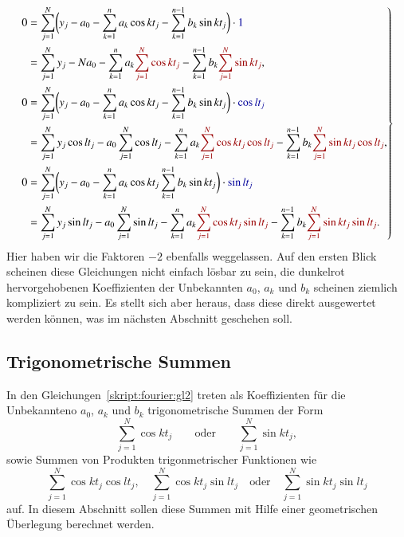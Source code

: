 \begin{equation}
\left.
\begin{aligned}
0&=
\sum_{j=1}^N
\biggl(
y_j - a_0 - \sum_{k=1}^n a_k\cos kt_j - \sum_{k=1}^{n-1} b_k\sin kt_j
\biggr)\cdot\mathstrut{\color{darkblue}1}
\\
&=
\sum_{j=1}^N y_j
-Na_0
-\sum_{k=1}^n a_k {\color{darkred}\sum_{j=1}^N\cos kt_j}
-\sum_{k=1}^{n-1} b_k {\color{darkred}\sum_{j=1}^N\sin kt_j},
\\
0&=
\sum_{j=1}^N
\biggl(
y_j - a_0 - \sum_{k=1}^n a_k\cos kt_j - \sum_{k=1}^{n-1} b_k\sin kt_j
\biggr)\cdot\mathstrut {\color{darkblue}\cos lt_j}
\\
&=
\sum_{j=1}^N y_j \cos lt_j
-a_0\sum_{j=1}^N \cos lt_j
-\sum_{k=1}^n a_k {\color{darkred}\sum_{j=1}^N\cos kt_j\cos lt_j}
-\sum_{k=1}^{n-1} b_k {\color{darkred}\sum_{j=1}^N\sin kt_j\cos lt_j},
\\
0
&=
\sum_{j=1}^N
\biggl(
y_j - a_0 - \sum_{k=1}^n a_k\cos kt_j \sum_{k=1}^{n-1} b_k\sin kt_j
\biggr)\cdot\mathstrut {\color{darkblue}\sin lt_j}
\\
&=
\sum_{j=1}^N y_j \sin lt_j
-a_0\sum_{j=1}^N \sin lt_j
-\sum_{k=1}^n a_k {\color{darkred}\sum_{j=1}^N\cos kt_j\sin lt_j}
-\sum_{k=1}^{n-1} b_k {\color{darkred}\sum_{j=1}^N\sin kt_j\sin lt_j}.
\end{aligned}
\right\}
\label{skript:fourier:gl2}
\end{equation}
Hier haben wir die Faktoren $-2$ ebenfalls weggelassen.
Auf den ersten Blick scheinen diese Gleichungen nicht einfach lösbar zu
sein, die {\color{darkred}dunkelrot} hervorgehobenen Koeffizienten der
Unbekannten $a_0$, $a_k$ und $b_k$ scheinen ziemlich kompliziert zu sein.
Es stellt sich aber heraus, dass diese direkt ausgewertet werden können,
was im nächsten Abschnitt geschehen soll.

\subsection{Trigonometrische Summen}
In den Gleichungen~\eqref{skript:fourier:gl2} treten als Koeffizienten
für die Unbekannteno $a_0$, $a_k$ und $b_k$ trigonometrische Summen
der Form
\begin{equation}
\sum_{j=1}^N \cos kt_j
\qquad
\text{oder}
\qquad
\sum_{j=1}^N \sin kt_j,
\label{skript:fourier:trigosum}
\end{equation}
sowie Summen von Produkten trigonmetrischer Funktionen wie
\begin{equation}
\sum_{j=1}^N \cos kt_j\cos lt_j,\quad
\sum_{j=1}^N \cos kt_j\sin lt_j
\quad
\text{oder}
\quad
\sum_{j=1}^N \sin kt_j\sin lt_j
\label{fourier:produkte}
\end{equation}
auf.
In diesem Abschnitt sollen diese Summen mit Hilfe einer geometrischen
Überlegung berechnet werden.

